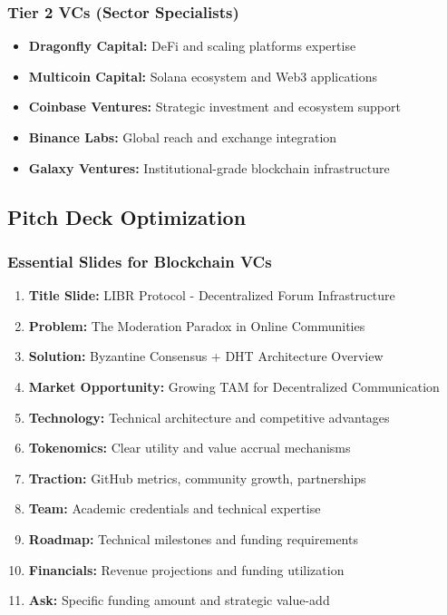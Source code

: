 \documentclass[12pt,a4paper]{article}
\begin{document}
\subsubsection{Tier 2 VCs (Sector Specialists)}
\begin{itemize}
    \item \textbf{Dragonfly Capital:} DeFi and scaling platforms expertise
    \item \textbf{Multicoin Capital:} Solana ecosystem and Web3 applications  
    \item \textbf{Coinbase Ventures:} Strategic investment and ecosystem support
    \item \textbf{Binance Labs:} Global reach and exchange integration
    \item \textbf{Galaxy Ventures:} Institutional-grade blockchain infrastructure
\end{itemize}

\subsection{Pitch Deck Optimization}

\subsubsection{Essential Slides for Blockchain VCs}
\begin{enumerate}
    \item \textbf{Title Slide:} LIBR Protocol - Decentralized Forum Infrastructure
    \item \textbf{Problem:} The Moderation Paradox in Online Communities
    \item \textbf{Solution:} Byzantine Consensus + DHT Architecture Overview  
    \item \textbf{Market Opportunity:} Growing TAM for Decentralized Communication
    \item \textbf{Technology:} Technical architecture and competitive advantages
    \item \textbf{Tokenomics:} Clear utility and value accrual mechanisms
    \item \textbf{Traction:} GitHub metrics, community growth, partnerships
    \item \textbf{Team:} Academic credentials and technical expertise
    \item \textbf{Roadmap:} Technical milestones and funding requirements
    \item \textbf{Financials:} Revenue projections and funding utilization
    \item \textbf{Ask:} Specific funding amount and strategic value-add
\end{enumerate}
\end{document}
